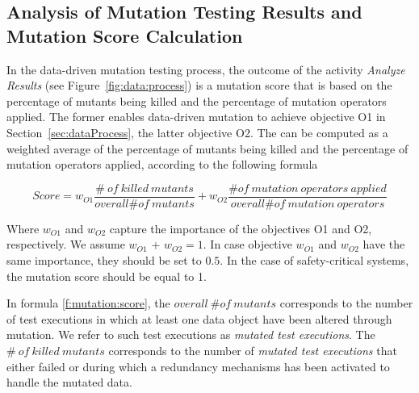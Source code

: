 
\newcommand{\ONMO}{\mathit{overall}\ \# \mathit{of}\ \mathit{mutation} \ \mathit{operators}}
\newcommand{\NMOA}{\# \mathit{of}\ \mathit{mutation} \ \mathit{operators} \ \mathit{applied}}


\subsection{Analysis of Mutation Testing Results and Mutation Score Calculation}
\label{sec:data:mutationscore}

In the data-driven mutation testing process, the outcome of the activity \emph{Analyze Results} (see Figure~\ref{fig:data:process}) is a mutation score that is based on
the percentage of mutants being killed and the percentage of mutation operators applied. 
The former enables data-driven mutation to achieve objective O1 in Section~\ref{sec:dataProcess}, the latter objective O2. 
The  can be computed as a weighted average of the percentage of mutants being killed and the percentage of mutation operators applied, according to the following formula

\begin{equation}
Score=w_{O1} \frac{\# \ \mathit{of}\ \mathit{killed} \ \mathit{mutants}}{\mathit{overall} \# \mathit{of}\ \mathit{mutants}} + w_{O2} \frac{\# \mathit{of}\ \mathit{mutation} \ \mathit{operators} \ \mathit{applied}}{\mathit{overall} \# \mathit{of}\ \mathit{mutation} \ \mathit{operators}}
\label{f:mutation:score}
\end{equation}

Where $w_{O1}$ and $w_{O2}$ capture the importance of the objectives O1 and O2, respectively. We assume $w_{O1}$ + $w_{O2} = 1$. In case objective $w_{O1}$ and $w_{O2}$ have the same importance, they should be set to $0.5$. In the case of safety-critical systems, the mutation score should be equal to 1.

In formula \ref{f:mutation:score}, the $\mathit{overall}\ \# \mathit{of}\ \mathit{mutants}$ corresponds to the number of test executions in which at least one data object have been altered through mutation. We refer to such test executions as \emph{mutated test executions}.
The $\# \ \mathit{of}\ \mathit{killed} \ \mathit{mutants}$ corresponds to the number of \emph{mutated test executions} that either failed or during which a redundancy mechanisms has been activated to handle the mutated data.

